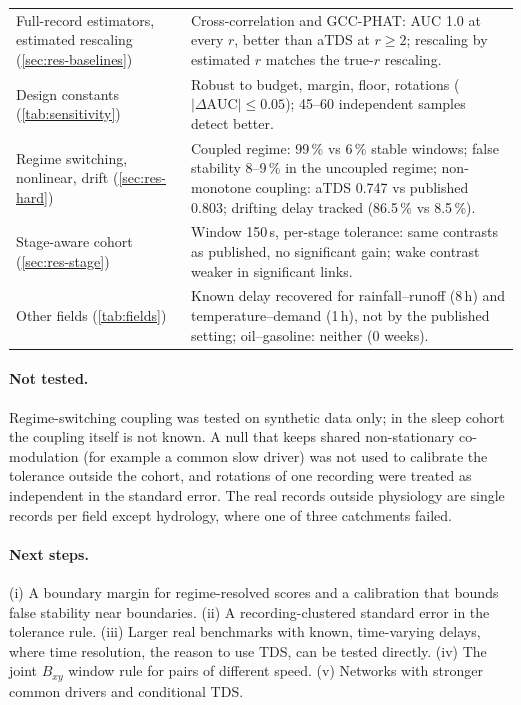 \documentclass[11pt,a4paper]{article}
\begin{document}
\begin{table}[t]
\begin{tabularx}{\textwidth}{>{\raggedright\arraybackslash}p{4.2cm}>{\raggedright\arraybackslash}X}
Full-record estimators, estimated rescaling (\cref{sec:res-baselines}) & Cross-correlation and GCC-PHAT: AUC 1.0 at every $r$, better than aTDS at $r \ge 2$; rescaling by estimated $r$ matches the true-$r$ rescaling. \\
Design constants (\cref{tab:sensitivity}) & Robust to budget, margin, floor, rotations ($|\Delta\mathrm{AUC}| \le 0.05$); 45--60 independent samples detect better. \\
Regime switching, nonlinear, drift (\cref{sec:res-hard}) & Coupled regime: 99\,\% vs 6\,\% stable windows; false stability 8--9\,\% in the uncoupled regime; non-monotone coupling: aTDS 0.747 vs published 0.803; drifting delay tracked (86.5\,\% vs 8.5\,\%). \\
Stage-aware cohort (\cref{sec:res-stage}) & Window 150\,s, per-stage tolerance: same contrasts as published, no significant gain; wake contrast weaker in significant links. \\
Other fields (\cref{tab:fields}) & Known delay recovered for rainfall--runoff (8\,h) and temperature--demand (1\,h), not by the published setting; oil--gasoline: neither (0 weeks). \\
\bottomrule
\end{tabularx}
\end{table}

\paragraph{Not tested.} Regime-switching coupling was tested on synthetic data only; in the sleep cohort the coupling itself is not known. A null that keeps shared non-stationary co-modulation (for example a common slow driver) was not used to calibrate the tolerance outside the cohort, and rotations of one recording were treated as independent in the standard error. The real records outside physiology are single records per field except hydrology, where one of three catchments failed.

\paragraph{Next steps.} (i) A boundary margin for regime-resolved scores and a calibration that bounds false stability near boundaries. (ii) A recording-clustered standard error in the tolerance rule. (iii) Larger real benchmarks with known, time-varying delays, where time resolution, the reason to use TDS, can be tested directly. (iv) The joint $B_{xy}$ window rule for pairs of different speed. (v) Networks with stronger common drivers and conditional TDS.
\end{document}
